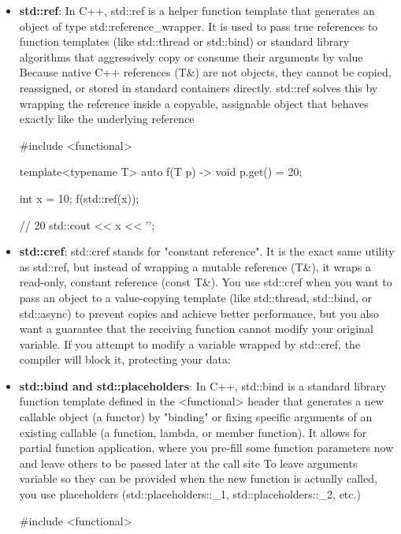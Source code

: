\documentclass{report}
\begin{document}
    \pagebreak 
    \begin{itemize}
        \item \textbf{std::ref}: In C++, std::ref is a helper function template that generates an object of type std::reference\_wrapper. It is used to pass true references to function templates (like std::thread or std::bind) or standard library algorithms that aggressively copy or consume their arguments by value      
            \bigbreak \noindent 
            Because native C++ references (T\&) are not objects, they cannot be copied, reassigned, or stored in standard containers directly. std::ref solves this by wrapping the reference inside a copyable, assignable object that behaves exactly like the underlying reference
            \bigbreak \noindent 
            \begin{cppcode}
                #include <functional>

                template<typename T>
                auto f(T p) -> void {
                    p.get() = 20;
                }

                int x = 10;
                f(std::ref(x));

                // 20
                std::cout << x << '\n';
            \end{cppcode}
        \item \textbf{std::cref}: std::cref stands for "constant reference". It is the exact same utility as std::ref, but instead of wrapping a mutable reference (T\&), it wraps a read-only, constant reference (const T\&).
            \bigbreak \noindent 
            You use std::cref when you want to pass an object to a value-copying template (like std::thread, std::bind, or std::async) to prevent copies and achieve better performance, but you also want a guarantee that the receiving function cannot modify your original variable.
            \bigbreak \noindent 
            If you attempt to modify a variable wrapped by std::cref, the compiler will block it, protecting your data:
        \item \textbf{std::bind and std::placeholders}: In C++, std::bind is a standard library function template defined in the <functional> header that generates a new callable object (a functor) by "binding" or fixing specific arguments of an existing callable (a function, lambda, or member function).
            \bigbreak \noindent 
            It allows for partial function application, where you pre-fill some function parameters now and leave others to be passed later at the call site
            \bigbreak \noindent 
            To leave arguments variable so they can be provided when the new function is actually called, you use placeholders (std::placeholders::\_1, std::placeholders::\_2, etc.)
            \bigbreak \noindent 
            \begin{cppcode}
                #include <functional>


\end{cppcode}
\end{itemize}
\end{document}
